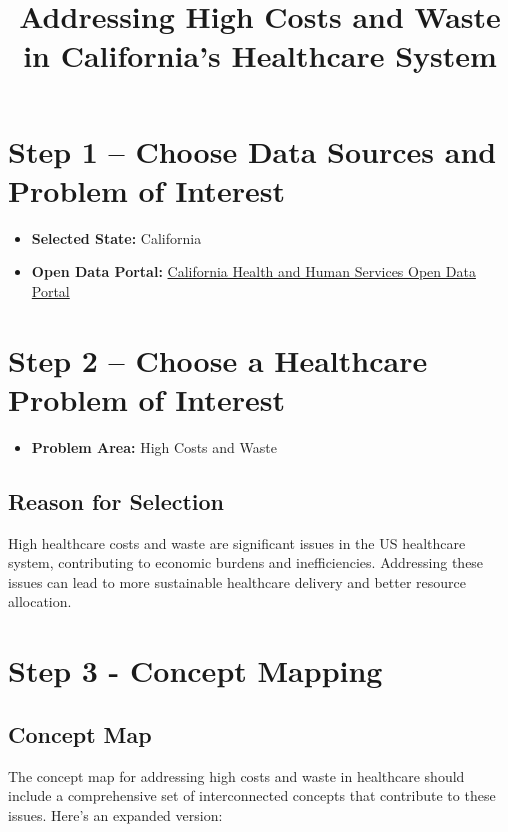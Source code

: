 \documentclass{article}
\title{Addressing High Costs and Waste in California's Healthcare System}
\author{}
\date{}
\begin{document}
\maketitle

\section*{Step 1 – Choose Data Sources and Problem of Interest}
\begin{itemize}
    \item \textbf{Selected State:} California
    \item \textbf{Open Data Portal:} \href{https://data.chhs.ca.gov/group/healthcare}{California Health and Human Services Open Data Portal}
\end{itemize}

\section*{Step 2 – Choose a Healthcare Problem of Interest}
\begin{itemize}
    \item \textbf{Problem Area:} High Costs and Waste
\end{itemize}

\subsection*{Reason for Selection}
High healthcare costs and waste are significant issues in the US healthcare system, contributing to economic burdens and inefficiencies. Addressing these issues can lead to more sustainable healthcare delivery and better resource allocation.

\section*{Step 3 - Concept Mapping}
\subsection*{Concept Map}
The concept map for addressing high costs and waste in healthcare should include a comprehensive set of interconnected concepts that contribute to these issues. Here’s an expanded version:
\end{document}
